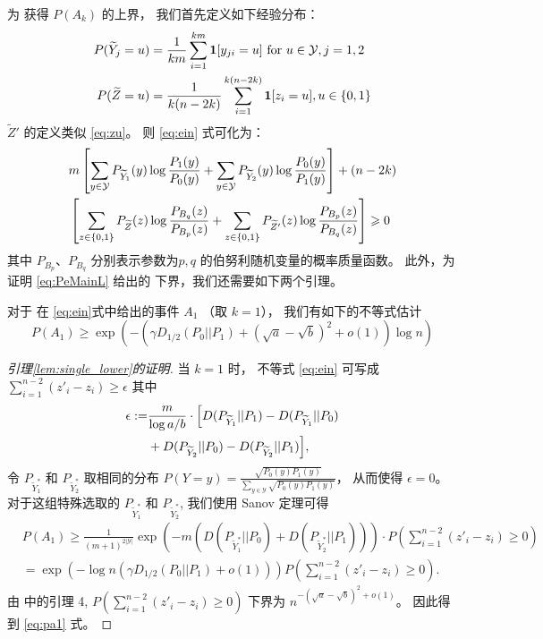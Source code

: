     为
    获得 $P(A_k)$
    的上界， 
    我们首先定义如下经验分布：
    \begin{align}
    P(\widetilde{Y}_j = u) &=
    \frac{1}{km} \sum_{i=1}^{km}
    \mathbf{1}[y_{ji} = u] \textrm{ for } u \in \mathcal{Y}, j=1,2 
    \notag \\
    P(\widetilde{Z} = u) &= \frac{1}{k(n-2k)}\sum_{i=1}^{k(n-2k)} \mathbf{1}[z_i = u], u \in \{0, 1\}
    \label{eq:zu}
    \end{align}
     $\widetilde{Z}'$ 
     的定义类似 \eqref{eq:zu}。
 则
    \eqref{eq:ein} 式可化为：
    \begin{align}
    &m\left[\sum_{y\in \mathcal{Y}}
    P_{\widetilde{Y}_1}(y)\log\frac{P_1(y)}
    {P_0(y)}
    +\sum_{y\in \mathcal{Y}}
    P_{\widetilde{Y}_2}(y)\log\frac{P_0(y)}
    {P_1(y)}
    \right] +(n-2k)\notag \\
    &\left[\sum_{z\in\{0,1\}}
    P_{\widetilde{Z}}(z) \log \frac{P_{B_q}(z)}
    {P_{B_p}(z)}
    + \sum_{z\in\{0,1\}} 
    P_{\widetilde{Z}'}(z) \log \frac{P_{B_p}(z)}
    {P_{B_q}(z)}\right] \geq 0 \label{eq:mnk}
    \end{align}
    其中 $P_{B_p}$、$P_{B_q}$ 分别表示参数为$p,q$
    的伯努利随机变量的概率质量函数。
    此外，为证明 \eqref{eq:PeMainL} 给出的
    下界，我们还需要如下两个引理。
    \begin{lemma}\label{lem:single_lower}
        对于 
         在 \eqref{eq:ein}式中给出的事件 $A_1$ 
          （取 $k=1$），
        我们有如下的不等式估计
        \begin{equation}\label{eq:pa1}
        P(A_1) \geq \exp(-(\gamma D_{1/2}(P_0||P_1) + (\sqrt{a}-\sqrt{b})^2 + o(1))\log n )
        \end{equation}
        \end{lemma}
        \begin{proof}[引理\ref{lem:single_lower}的证明] 
当 $k=1$ 时，
不等式 \eqref{eq:ein} 可写成
$\sum_{i=1}^{n-2} (z'_i - z_i)
\geq \epsilon$
其中
\begin{align*}
\epsilon := &\frac{m}{\log a/b}\cdot 
\Bigl[D(P_{\widetilde{Y}_{1}} || P_1) 
- D(P_{\widetilde{Y}_{1}} || P_0) \\
&+D(P_{\widetilde{Y}_{2}} || P_0) -
D(P_{\widetilde{Y}_{2}} || P_1)\Bigr],
\end{align*}
令 $P_{\widetilde{Y}^{*}_1}$
和 $P_{\widetilde{Y}^{*}_2}$
取相同的分布
$P(Y=y)=\frac{\sqrt{P_0(y)P_1(y)}}
{ \sum_{y\in \mathcal{Y}}
\sqrt{P_0(y) P_1(y)}} $，
从而使得 $\epsilon =0$。
对于这组特殊选取的
$P_{\widetilde{Y}^{*}_1}$
和 $P_{\widetilde{Y}^{*}_2}$,
我们使用 Sanov 定理可得
\begin{align*}
&P(A_1)
\geq\frac{1}
{(m+1)^{2|\mathcal{Y}|}}
\exp \left(-m(D(P_{\widetilde{Y}^*_1} || P_0)
+ D(P_{\widetilde{Y}^*_2} || P_1))
\right)
\cdot P\left(\sum_{i=1}^{n-2} (z'_i - z_i) \geq 0\right)\\
& = \exp(-\log n (\gamma D_{1/2}(P_0||P_1)+o(1))) P(\sum_{i=1}^{n-2} (z'_i - z_i) \geq 0).
\end{align*}
由 \citet{abbe2015exact}
中的引理 4,
$P(\sum_{i=1}^{n-2} (z'_i - z_i) \geq 0)$ 下界为
 $n^{-(\sqrt{a} - \sqrt{b})^2 + o(1)}$。
因此得到 \eqref{eq:pa1} 式。
        \end{proof}

